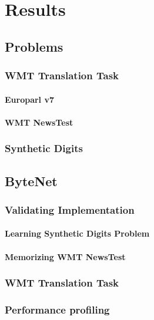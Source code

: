 \chapter{Results}

\section{Problems}

\subsection{WMT Translation Task}
\subsubsection{Europarl v7}
\subsubsection{WMT NewsTest}

\subsection{Synthetic Digits}

\clearpage
\section{ByteNet}

\subsection{Validating Implementation}
\subsubsection{Learning Synthetic Digits Problem}
\subsubsection{Memorizing WMT NewsTest}

\subsection{WMT Translation Task}

\subsection{Performance profiling}

